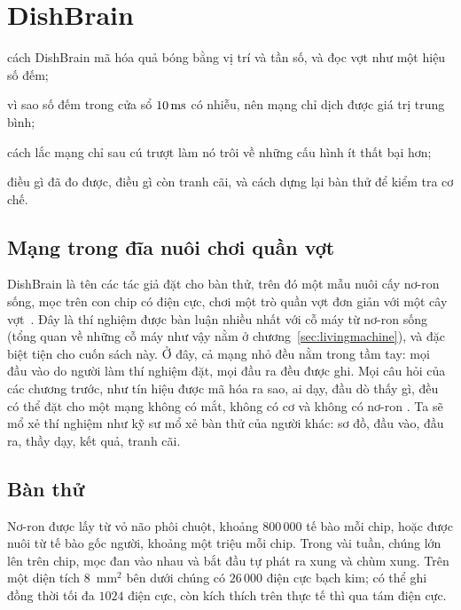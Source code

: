 \chapter{DishBrain}
\label{sec:dishbrain}
\begin{chaptergoals}
\item cách DishBrain mã hóa quả bóng bằng vị trí và tần số, và đọc vợt như một hiệu số đếm;
\item vì sao số đếm trong cửa sổ $10\,\text{ms}$ có nhiễu, nên mạng chỉ dịch được giá trị trung bình;
\item cách lắc mạng chỉ sau cú trượt làm nó trôi về những cấu hình ít thất bại hơn;
\item điều gì đã đo được, điều gì còn tranh cãi, và cách dựng lại bàn thử để kiểm tra cơ chế.
\end{chaptergoals}

\section{Mạng trong đĩa nuôi chơi quần vợt}

DishBrain là tên các tác giả đặt cho bàn thử, trên đó một mẫu nuôi cấy nơ-ron sống, mọc trên con chip có điện cực, chơi một trò quần vợt đơn giản với một cây vợt~\cite{Kagan2022}. Đây là thí nghiệm được bàn luận nhiều nhất với cỗ máy từ nơ-ron sống (tổng quan về những cỗ máy như vậy nằm ở chương~\ref{sec:livingmachine}), và đặc biệt tiện cho cuốn sách này. Ở đây, cả mạng nhỏ đều nằm trong tầm tay: mọi đầu vào do người làm thí nghiệm đặt, mọi đầu ra đều được ghi. Mọi câu hỏi của các chương trước, như tín hiệu được mã hóa ra sao, ai dạy, đầu dò thấy gì, đều có thể đặt cho một mạng không có mắt, không có cơ và không có nơ-ron . Ta sẽ mổ xẻ thí nghiệm như kỹ sư mổ xẻ bàn thử của người khác: sơ đồ, đầu vào, đầu ra, thầy dạy, kết quả, tranh cãi.

\section{Bàn thử}

Nơ-ron được lấy từ vỏ não phôi chuột, khoảng $800\,000$ tế bào mỗi chip, hoặc được nuôi từ tế bào gốc người, khoảng một triệu mỗi chip. Trong vài tuần, chúng lớn lên trên chip, mọc đan vào nhau và bắt đầu tự phát ra xung và chùm xung. Trên một diện tích $8$~mm$^2$ bên dưới chúng có $26\,000$ điện cực bạch kim; có thể ghi đồng thời tối đa $1024$ điện cực, còn kích thích trên thực tế thì qua tám điện cực.

